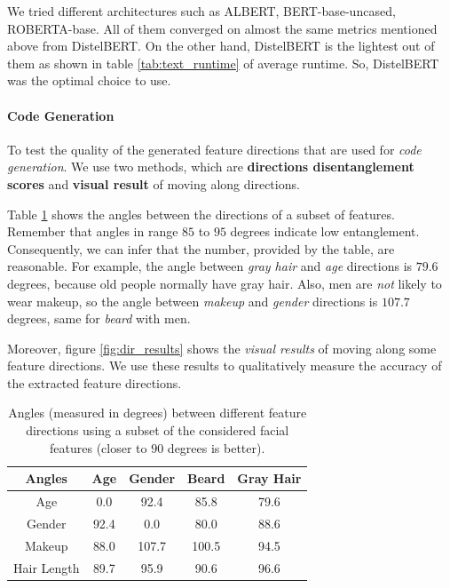 We tried different architectures such as ALBERT, BERT-base-uncased, ROBERTA-base. All of them converged on almost the same metrics mentioned above from DistelBERT. On the other hand, DistelBERT is the lightest out of them as shown in table \ref{tab:text_runtime} of average runtime. So, DistelBERT was the optimal choice to use.

\paragraph{Code Generation}
To test the quality of the generated feature directions that are used for \emph{code generation}. We use two methods, which are \textbf{directions disentanglement scores} and \textbf{visual result} of moving along directions.

Table \ref{tab:angles} shows the angles between the directions of a subset of features. Remember that angles in range $85$ to $95$ degrees indicate low entanglement. Consequently, we can infer that the number, provided by the table, are reasonable. For example, the angle between \emph{gray hair} and \emph{age} directions is $79.6$ degrees, because old people normally have gray hair. Also, men are \emph{not} likely to wear makeup, so the angle between \emph{makeup} and \emph{gender} directions is $107.7$ degrees, same for \emph{beard} with men.

Moreover, figure \ref{fig:dir_results} shows the \emph{visual results} of moving along some feature directions. We use these results to qualitatively measure the accuracy of the extracted feature directions.

\begin{table}[ht]
\caption{Angles (measured in degrees) between different feature directions using a subset of the considered facial features (closer to $90$ degrees is better).}
\centering
\begin{tabular}[t]{| c | c | c | c | c |}
\hline
\textbf{Angles} & Age & Gender & Beard & Gray Hair \\
\hline \hline
Age & 0.0 & 92.4 & 85.8 & 79.6 \\
\hline
Gender & 92.4 & 0.0 & 80.0 & 88.6 \\
\hline
Makeup & 88.0 & 107.7 & 100.5 & 94.5 \\
\hline
Hair Length & 89.7 & 95.9 & 90.6 & 96.6 \\
\hline
\end{tabular}

\label{tab:angles}
\end{table}

